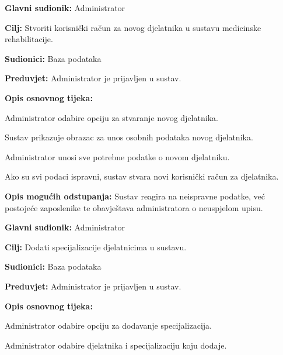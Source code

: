 \vspace{1em} %
\noindent{}
\begin{packed_item}
	\item \textbf{Glavni sudionik:} Administrator
	\item \textbf{Cilj:} Stvoriti korisnički račun za novog djelatnika u sustavu medicinske rehabilitacije.
	\item \textbf{Sudionici:} Baza podataka
	\item \textbf{Preduvjet:} Administrator je prijavljen u sustav.
	\item \textbf{Opis osnovnog tijeka:}
	\begin{packed_enum}
		\item Administrator odabire opciju za stvaranje novog djelatnika.
		\item Sustav prikazuje obrazac za unos osobnih podataka novog djelatnika.
		\item Administrator unosi sve potrebne podatke o novom djelatniku.
		\item Ako su svi podaci ispravni, sustav stvara novi korisnički račun za djelatnika.
	\end{packed_enum}
	\item \textbf{Opis mogućih odstupanja:}
	Sustav reagira na neispravne podatke, već postojeće zaposlenike te obavještava administratora o neuspjelom upisu.
\end{packed_item}

\vspace{1em} %
\noindent{}
\begin{packed_item}
	\item \textbf{Glavni sudionik:} Administrator
	\item \textbf{Cilj:} Dodati specijalizacije djelatnicima u sustavu.
	\item \textbf{Sudionici:} Baza podataka
	\item \textbf{Preduvjet:} Administrator je prijavljen u sustav.
	\item \textbf{Opis osnovnog tijeka:}
	\begin{packed_enum}
		\item Administrator odabire opciju za dodavanje specijalizacija.
		\item Administrator odabire djelatnika i specijalizaciju koju dodaje.
	\end{packed_enum}
\end{packed_item}

